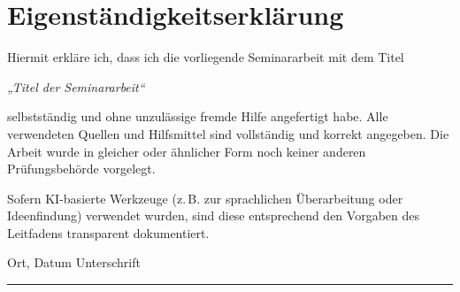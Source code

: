 \newpage
\thispagestyle{empty}

\section*{Eigenständigkeitserklärung}

Hiermit erkläre ich, dass ich die vorliegende Seminararbeit mit dem Titel

\begin{center}
\textit{„Titel der Seminararbeit“}
\end{center}

selbstständig und ohne unzulässige fremde Hilfe angefertigt habe.  
Alle verwendeten Quellen und Hilfsmittel sind vollständig und korrekt angegeben.  
Die Arbeit wurde in gleicher oder ähnlicher Form noch keiner anderen Prüfungsbehörde vorgelegt.

Sofern KI-basierte Werkzeuge (z.\,B. zur sprachlichen Überarbeitung oder Ideenfindung) verwendet wurden, sind diese entsprechend den Vorgaben des Leitfadens transparent dokumentiert.

\vspace{3cm}

\noindent
Ort, Datum \hfill Unterschrift

\vspace{1cm}

\noindent
\rule{6cm}{0.4pt}
